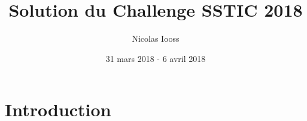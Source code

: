 \documentclass[a4paper,10pt]{article}
\title{Solution du Challenge SSTIC 2018}
\author{Nicolas Iooss}
\date{31 mars 2018 - 6 avril 2018}
\begin{document}
\maketitle

\section*{Introduction}



\clearpage
{\setlength{\parskip}{.4\baselineskip}\tableofcontents}

\clearpage

\clearpage

\clearpage

\clearpage


\clearpage
\begin{appendices}



\end{appendices}
\end{document}
